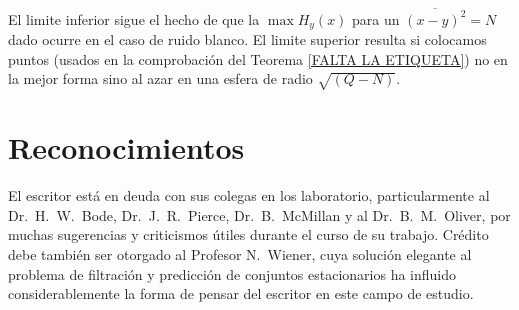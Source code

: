 El limite inferior sigue el hecho de que la $\max H_{y}(x)$ para un
$\overline{(x - y)^{2}} = N$ dado ocurre en el caso de ruido
blanco. El limite superior resulta si colocamos puntos (usados en la
comprobaci\'on del Teorema \ref{FALTA LA ETIQUETA}) no en la mejor
forma sino al azar en una esfera de radio $\sqrt{(Q - N)}$.

\clearpage

\section*{Reconocimientos}

El escritor est\'{a} en deuda con sus colegas en los laboratorio,
particularmente al Dr.\ H.\ W.\ Bode, Dr.\ J.\ R.\ Pierce,
Dr.\ B.\ McMillan y al Dr.\ B.\ M.\ Oliver, por muchas sugerencias y
criticismos \'utiles durante el curso de su trabajo. Cr\'{e}dito debe
tambi\'en ser otorgado al Profesor N.\ Wiener, cuya soluci\'on
elegante al problema de filtraci\'on y predicci\'on de conjuntos
estacionarios ha influido considerablemente la forma de pensar del
escritor en este campo de estudio.

\clearpage

